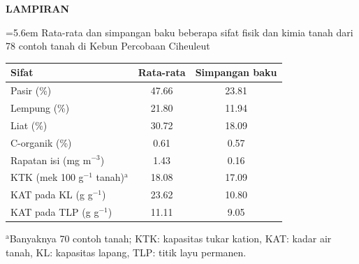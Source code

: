 
\clearpage
\vspace*{\fill}
\begin{center}
  {\fontsize{14pt}{17pt}\selectfont\bfseries LAMPIRAN}
\end{center}
\vspace*{\fill}

\clearpage

\label{lamp:tanah}

\noindent\hangindent=5.6em
%
Rata-rata dan simpangan baku beberapa sifat fisik dan kimia tanah dari
78 contoh tanah di Kebun Percobaan Ciheuleut

\vspace{4pt}

\centering
\begin{tabular}{lcc}
  \toprule
  Sifat
    & Rata-rata
    & Simpangan baku \\
  \midrule
  Pasir (\%)                        & 47.66 & 23.81 \\
  Lempung (\%)                      & 21.80 & 11.94 \\
  Liat (\%)                         & 30.72 & 18.09 \\
  C-organik (\%)                    & 0.61  & 0.57  \\
  Rapatan isi (mg m$^{-3}$)         & 1.43  & 0.16  \\
  KTK (mek 100 g$^{-1}$ tanah)$^{\mathrm{a}}$
                                    & 18.08 & 17.09 \\
  KAT pada KL (g g$^{-1}$)         & 23.62 & 10.80 \\
  KAT pada TLP (g g$^{-1}$)        & 11.11 & 9.05  \\
  \bottomrule
\end{tabular}

\begin{minipage}{0.85\textwidth}
  \vspace{3pt}
  \footnotesize
  $^{\mathrm{a}}$Banyaknya 70 contoh tanah; KTK: kapasitas tukar kation,
  KAT: kadar air tanah, KL: kapasitas lapang, TLP: titik layu permanen.
\end{minipage}

